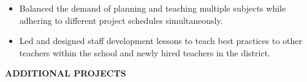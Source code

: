 \documentclass[11pt]{article}
\begin{document}
\begin{itemize}[leftmargin=*, itemsep=0pt, topsep=5pt]
	\item Balanced the demand of planning and teaching multiple subjects while adhering to different project schedules simultaneously.
	\item Led and designed staff development lessons to teach best practices to other teachers within the school and newly hired teachers in the district.
\end{itemize}
\medbreak \noindent
%
%
\noindent
\makebox[0pt][l]{\rule[-.2\baselineskip]{\linewidth}{.3mm}}\large{\textbf{ADDITIONAL PROJECTS}}
\end{document}
